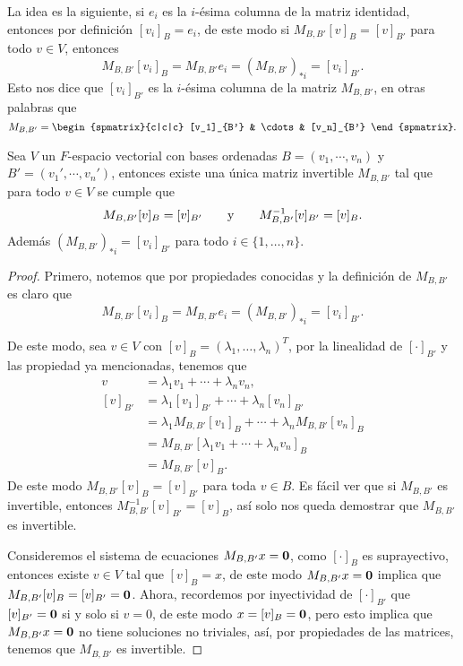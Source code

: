 La idea es la siguiente, si $e_i$ es la $i$-ésima columna de la matriz identidad, entonces por definición $[v_i]_B = e_i$, de este modo si $M_{B,B'} [v]_B = [v]_{B'}$ para todo $v \in V$, entonces
  \[ M_{B,B'} [v_i]_B = M_{B,B'} e_i = (M_{B,B'})_{*i} = [v_i]_{B'}. \]
Esto nos dice que $[v_i]_{B'}$ es la $i$-ésima columna de la matriz $M_{B,B'}$, en otras palabras que
  \[ M_{B,B'} = \begin{spmatrix}{c|c|c}  [v_1]_{B'} & \cdots & [v_n]_{B'}  \end{spmatrix}. \]

\begin{teor}
  Sea $V$ un $F$-espacio vectorial con bases ordenadas $B = (v_1,\cdots,v_n)$ y $B' = (v_1',\cdots,v_n')$, entonces existe una única matriz invertible $M_{B,B'}$ tal que para todo $v \in V$ se cumple que
    \[ M_{B,B'}[v]_B = [v]_{B'} \qquad\text{y}\qquad M_{B,B'}^{-1}[v]_{B'} = [v]_B. \]
  Además $(M_{B,B'})_{*i} = [v_i]_{B'}$ para todo $i \in \{1,\ldots,n\}$.
\end{teor}
\begin{proof}
  Primero, notemos que por propiedades conocidas y la definición de $M_{B,B'}$ es claro que 
    \[ M_{B,B'}[v_i]_B = M_{B,B'} e_i =  (M_{B,B'})_{*i} = [v_i]_{B'}. \]

  De este modo, sea $v \in V$ con $[v]_B = (\lambda_1,\ldots,\lambda_n)^T$, por la linealidad de $[\cdot]_{B'}$ y las propiedad ya mencionadas, tenemos que
    \begin{align*}
      v        &= \lambda_1 v_1 + \cdots + \lambda_n v_n, \\
      [v]_{B'} &= \lambda_1 [v_1]_{B'} + \cdots + \lambda_n [v_n]_{B'} \\
               &= \lambda_1 M_{B,B'}[v_1]_B + \cdots + \lambda_n M_{B,B'}[v_n]_B \\
               &= M_{B,B'} [\lambda_1 v_1 + \cdots + \lambda_n v_n ]_B \\
               &= M_{B,B'} [ v ]_B.
    \end{align*}
  De este modo $M_{B,B'}[v]_B = [v]_{B'}$ para toda $v \in B$. Es fácil ver que si $M_{B,B'}$ es invertible, entonces $M_{B,B'}^{-1}[v]_{B'} = [v]_B$, así solo nos queda demostrar que $M_{B,B'}$ es invertible.
  
  Consideremos el sistema de ecuaciones $M_{B,B'}x = \mathbf{0}$, como $[\cdot]_B$ es suprayectivo, entonces existe $v \in V$ tal que $[v]_B = x$, de este modo $M_{B,B'}x = \mathbf{0}$ implica que $M_{B,B'}[v]_B = [v]_{B'} = \mathbf{0}$. Ahora, recordemos por inyectividad de $[\cdot]_{B'}$ que $[v]_{B'} = \mathbf{0}$ si y solo si $v = 0$, de este modo $x = [v]_{B} = \mathbf{0}$, pero esto implica que $M_{B,B'}x = \mathbf{0}$ no tiene soluciones no triviales, así, por propiedades de las matrices, tenemos que $M_{B,B'}$ es invertible.
\end{proof}